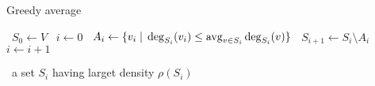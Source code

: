 \begin{algorithm}
    \caption{Greedy average}\label{alg:greedy_parallel_avg}
    \begin{algorithmic}%
            \State~$S_0 \gets V$
            \State~$i \gets 0$
                    \State~$A_i \gets \{ v_i \; \vert \; \deg_{S_i}(v_i) \leq \operatorname*{avg}_{v \in S_i} \deg_{S_i}(v) \}$
                    \State~$S_{i+1} \gets S_i \setminus A_i$
                    \State~$i \gets i+1$
                \EndWhile
                
            \Return~a set $S_i$ having larget density $\rho(S_i)$
        \EndProcedure
    \end{algorithmic}
\end{algorithm}